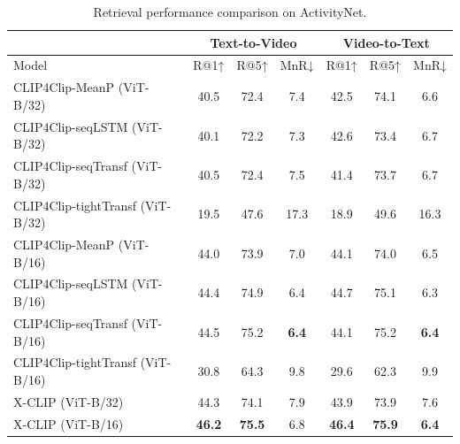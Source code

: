 \documentclass[sigconf]{acmart}
\begin{document}
\begin{table}[]
\caption{Retrieval performance comparison on ActivityNet.}
\begin{tabular}{l|ccc|ccc}
 \hline
           & \multicolumn{3}{c|}{Text-to-Video}            & \multicolumn{3}{c}{Video-to-Text}            \\ \hline
Model      & R@1↑          & R@5↑          & MnR↓         & R@1↑          & R@5↑          & MnR↓         \\ \hline
CLIP4Clip-MeanP (ViT-B/32)  & 40.5 & 72.4 & 7.4 & 42.5 & 74.1 & 6.6 \\
 CLIP4Clip-seqLSTM (ViT-B/32)     & 40.1 & 72.2 & 7.3  & 42.6 & 73.4 & 6.7  \\
 CLIP4Clip-seqTransf (ViT-B/32)    & 40.5 & 72.4 & 7.5  & 41.4 & 73.7 & 6.7  \\
 CLIP4Clip-tightTransf (ViT-B/32)   & 19.5 & 47.6 & 17.3 & 18.9 & 49.6 & 16.3 \\
CLIP4Clip-MeanP (ViT-B/16)  & 44.0   &  73.9    &  7.0   &   44.1   &  74.0    &   6.5  \\ 
CLIP4Clip-seqLSTM (ViT-B/16)  & 44.4 & 74.9 & 6.4 & 44.7 & 75.1 & 6.3  \\ 
CLIP4Clip-seqTransf (ViT-B/16)  & 44.5   &  75.2    &  \textbf{6.4}   &   44.1   &  75.2    &   \textbf{6.4} \\ 
CLIP4Clip-tightTransf (ViT-B/16)  & 30.8 & 64.3 & 9.8 & 29.6 & 62.3 & 9.9 \\ 
\hline
X-CLIP (ViT-B/32)    & 44.3 & 74.1 & 7.9 & 43.9 & 73.9 & 7.6 \\
X-CLIP (ViT-B/16)    & \textbf{46.2} & \textbf{75.5} & 6.8 & \textbf{46.4} & \textbf{75.9} & \textbf{6.4}     \\   \hline
\end{tabular}
\label{tab:acnet_performance2}
\end{table}
\end{document}
